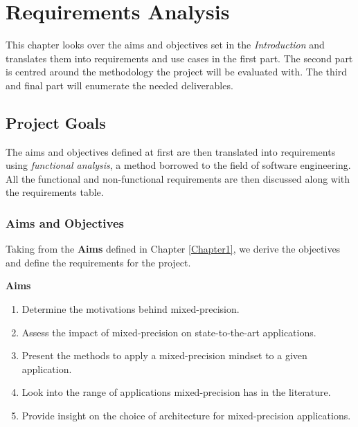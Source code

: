 \chapter{Requirements Analysis} %

\label{Chapter4} %



This chapter looks over the aims and objectives set in the \emph{Introduction} and translates them into requirements and use cases in the first part. The second part is centred around the methodology the project will be evaluated with. The third and final part will enumerate the needed deliverables.

\section{Project Goals}

The aims and objectives defined at first are then translated into requirements using \emph{functional analysis}, a method borrowed to the field of software engineering. All the functional and non-functional requirements are then discussed along with the requirements table.


\subsection{Aims and Objectives}

Taking from the \textbf{Aims} defined in Chapter \ref{Chapter1}, we derive the objectives and define the requirements for the project.

\textbf{Aims}

\begin{enumerate}
  \item Determine the motivations behind mixed-precision.
  \item Assess the impact of mixed-precision on state-to-the-art applications.
  \item Present the methods to apply a mixed-precision mindset to a given application.
  \item Look into the range of applications mixed-precision has in the literature.
  \item Provide insight on the choice of architecture for mixed-precision applications.
\end{enumerate}

